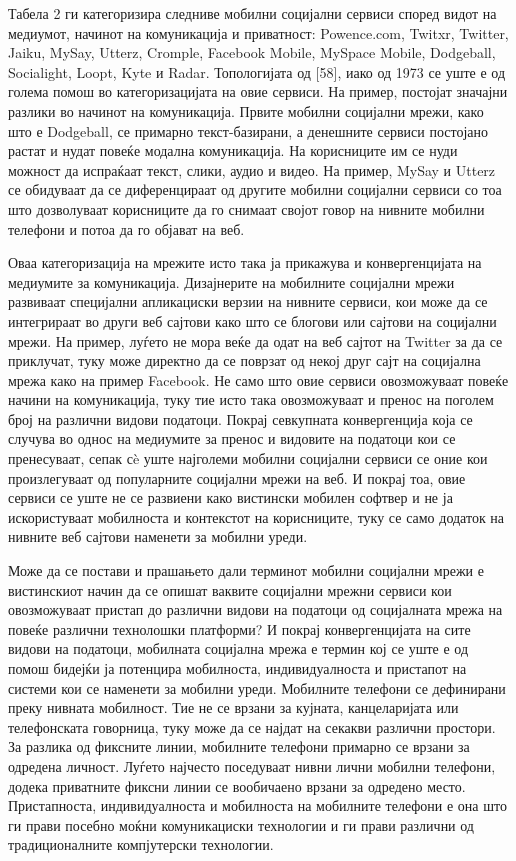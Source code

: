 Табела 2 ги категоризира следниве мобилни социјални сервиси според видот на
медиумот, начинот на комуникација и приватност: Powence.com, Twitxr, Twitter,
Jaiku, MySay, Utterz, Cromple, Facebook Mobile, MySpace Mobile, Dodgeball,
Socialight, Loopt, Kyte и Radar. Топологијата од [58], иако од 1973 се уште е од
голема помош во категоризацијата на овие сервиси. На пример, постојат значајни
разлики во начинот на комуникација. Првите мобилни социјални мрежи, како што е
Dodgeball, се примарно текст-базирани, а денешните сервиси постојано растат и
нудат повеќе модална комуникација. На корисниците им се нуди можност да
испраќаат текст, слики, аудио и видео. На пример, MySay и Utterz се обидуваат да
се диференцираат од другите мобилни социјални сервиси со тоа што дозволуваат
корисниците да го снимаат својот говор на нивните мобилни телефони и потоа да го
објават на веб.

Оваа категоризација на мрежите исто така ја прикажува и конвергенцијата на
медиумите за комуникација. Дизајнерите на мобилните социјални мрежи развиваат
специјални апликациски верзии на нивните сервиси, кои може да се интегрираат во
други веб сајтови како што се блогови или сајтови на социјални мрежи. На пример,
луѓето не мора веќе да одат на веб сајтот на Twitter за да се приклучат, туку
може директно да се поврзат од некој друг сајт на социјална мрежа како на пример
Facebook. Не само што овие сервиси овозможуваат повеќе начини на комуникација,
туку тие исто така овозможуваат и пренос на поголем број на различни видови
податоци. Покрај севкупната конвергенција која се случува во однос на медиумите
за пренос и видовите на податоци кои се пренесуваат, сепак сè уште најголеми
мобилни социјални сервиси се оние кои произлегуваат од популарните социјални
мрежи на веб. И покрај тоа, овие сервиси се уште не се развиени како вистински
мобилен софтвер и не ја искористуваат мобилноста и контекстот на корисниците,
туку се само додаток на нивните веб сајтови наменети за мобилни уреди.

Може да се постави и прашањето дали терминот мобилни социјални мрежи е
вистинскиот начин да се опишат ваквите социјални мрежни сервиси кои овозможуваат
пристап до различни видови на податоци од социјалната мрежа на повеќе различни
технолошки платформи? И покрај конвергенцијата на сите видови на податоци,
мобилната социјална мрежа е термин кој се уште е од помош бидејќи ја потенцира
мобилноста, индивидуалноста и пристапот на системи кои се наменети за мобилни
уреди. Мобилните телефони се дефинирани преку нивната мобилност. Тие не се
врзани за кујната, канцеларијата или телефонската говорница, туку може да се
најдат на секакви различни простори. За разлика од фиксните линии, мобилните
телефони примарно се врзани за одредена личност. Луѓето најчесто поседуваат
нивни лични мобилни телефони, додека приватните фиксни линии се вообичаено
врзани за одредено место. Пристапноста, индивидуалноста и мобилноста на
мобилните телефони е она што ги прави посебно моќни комуникациски технологии и
ги прави различни од традиционалните компјутерски технологии.

